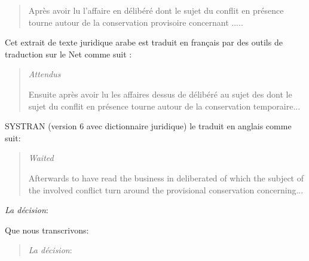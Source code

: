 \documentclass[french]{textolivre}
\begin{document}
\begin{quote}
Après avoir lu l’affaire en délibéré dont le sujet du conflit en présence tourne autour de la conservation provisoire concernant .....
\end{quote}

Cet extrait de texte juridique arabe est traduit en français par des outils de traduction sur le Net comme suit :

\begin{quote}
\emph{Attendus}

Ensuite après avoir lu les affaires dessus de délibéré au sujet des dont le sujet du conflit en présence tourne autour de la conservation temporaire...
\end{quote}

SYSTRAN (version 6 avec dictionnaire juridique) le traduit en anglais comme suit:

\begin{quote}
\emph{Waited}

Afterwards to have read the business in deliberated of which the subject of the involved conflict turn around the provisional conservation concerning...
\end{quote}

\emph{La décision}:

\begin{quote}
\end{quote}

Que nous transcrivons: 

\begin{quote}
\emph{La décision}: 
\end{quote}
\end{document}
